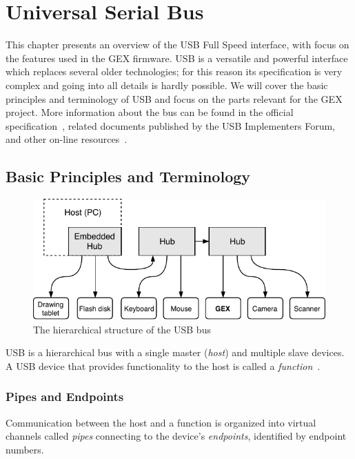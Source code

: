 \chapter{Universal Serial Bus}

This chapter presents an overview of the \acrfull{USB} Full Speed interface, with focus on the features used in the GEX firmware. \gls{USB} is a versatile and powerful interface which replaces several older technologies; for this reason its specification is very complex and going into all details is hardly possible. We will cover the basic principles and terminology of \gls{USB} and focus on the parts relevant for the GEX project. More information about the bus can be found in the official specification~\cite{usbif-spec}, related documents published by the USB Implementers Forum, and other on-line resources~\cite{usb-nutshell,usb-made-simple}.

\section{Basic Principles and Terminology}

\begin{figure}[h]
	\centering
	\includegraphics[scale=1] {img/usb-hierarchy-redraw.pdf}
	\caption[USB hierarchical structure]{\label{fig:usb-hierarchy}The hierarchical structure of the USB bus}
\end{figure}

\gls{USB} is a hierarchical bus with a single master (\textit{host}) and multiple slave devices. A \gls{USB} device that provides functionality to the host is called a \textit{function}~\cite{usb-function}.

\subsection{Pipes and Endpoints}

Communication between the host and a function is organized into virtual channels called \textit{pipes} connecting to the device's \textit{endpoints}, identified by endpoint numbers.

